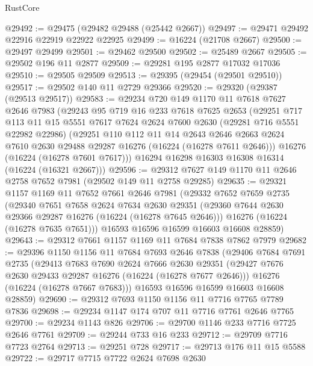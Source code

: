 \begin{lexlean}{RustCore}
\begin{coremodule}
@29492 := @29475 (@29482 @29488 (@25442 @2667))
@29497 := @29471 @29492 @22916 @22919 @22922 @22925
@29499 := @16224 (@21708 @2667)
@29500 := @29497 @29499
@29501 := @29462 @29500
@29502 := @25489 @2667
@29505 := @29502 @196 @11 @2877
@29509 := @29281 @195 @2877 @17032 @17036
@29510 := @29505 @29509
@29513 := @29395 (@29454 (@29501 @29510))
@29517 := @29502 @140 @11 @2729 @29366
@29520 := @29320 (@29387 (@29513 @29517))
@29583 := @29234
    @720
    @149
    @1170
    @11
    @7618
    @7627
    @2646
    @7983
    (@29243
      @95
      @719
      @16
      @233
      @7618
      @7625
      @2653
      (@29251
        @717
        @113
        @11
        @15
        @5551
        @7617
        @7624
        @2624
        @7600
        @2630
        (@29281 @716 @5551 @22982 @22986)
        (@29251
          @110
          @112
          @11
          @14
          @2643
          @2646
          @2663
          @2624
          @7610
          @2630
          @29488
          @29287
          @16276
          (@16224 (@16278 @7611 @2646)))
        @16276
        (@16224 (@16278 @7601 @7617)))
      @16294
      @16298
      @16303
      @16308
      @16314
      (@16224 (@16321 @2667)))
@29596 := @29312 @7627 @149 @1170 @11 @2646 @2758 @7652 @7981 (@29502 @149 @11 @2758 @29285)
@29635 := @29321
    @1157
    @1169
    @11
    @7652
    @7661
    @2646
    @7981
    (@29332
      @7652
      @7659
      @2735
      (@29340
        @7651
        @7658
        @2624
        @7634
        @2630
        @29351
        (@29360 @7644 @2630 @29366 @29287 @16276 (@16224 (@16278 @7645 @2646)))
        @16276
        (@16224 (@16278 @7635 @7651)))
      @16593
      @16596
      @16599
      @16603
      @16608
      @28859)
@29643 := @29312 @7661 @1157 @1169 @11 @7684 @7838 @7862 @7979
@29682 := @29396
    @1150
    @1156
    @11
    @7684
    @7693
    @2646
    @7838
    (@29406
      @7684
      @7691
      @2735
      (@29413
        @7683
        @7690
        @2624
        @7666
        @2630
        @29351
        (@29427 @7676 @2630 @29433 @29287 @16276 (@16224 (@16278 @7677 @2646)))
        @16276
        (@16224 (@16278 @7667 @7683)))
      @16593
      @16596
      @16599
      @16603
      @16608
      @28859)
@29690 := @29312 @7693 @1150 @1156 @11 @7716 @7765 @7789 @7836
@29698 := @29234 @1147 @174 @707 @11 @7716 @7761 @2646 @7765
@29700 := @29234 @1143 @826
@29706 := @29700 @1146 @233 @7716 @7725 @2646 @7761
@29709 := @29244 @733 @16 @233
@29712 := @29709 @7716 @7723 @2764
@29713 := @29251 @728
@29717 := @29713 @176 @11 @15 @5588
@29722 := @29717 @7715 @7722 @2624 @7698 @2630

\end{coremodule}
\end{lexlean}
